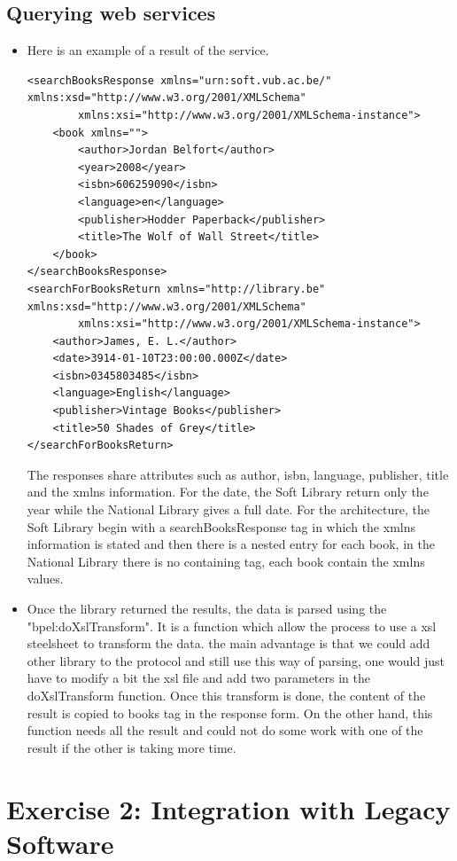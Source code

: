 \documentclass[a4paper,10pt]{article}
\begin{document}
\subsection{Querying web services}
\begin{itemize}
\item Here is an example of a result of the service.
\begin{verbatim}
<searchBooksResponse xmlns="urn:soft.vub.ac.be/" xmlns:xsd="http://www.w3.org/2001/XMLSchema"
        xmlns:xsi="http://www.w3.org/2001/XMLSchema-instance">
    <book xmlns="">
        <author>Jordan Belfort</author>
        <year>2008</year>
        <isbn>606259090</isbn>
        <language>en</language>
        <publisher>Hodder Paperback</publisher>
        <title>The Wolf of Wall Street</title>
    </book>
</searchBooksResponse>
<searchForBooksReturn xmlns="http://library.be" xmlns:xsd="http://www.w3.org/2001/XMLSchema" 
        xmlns:xsi="http://www.w3.org/2001/XMLSchema-instance">
    <author>James, E. L.</author>
    <date>3914-01-10T23:00:00.000Z</date>
    <isbn>0345803485</isbn>
    <language>English</language>
    <publisher>Vintage Books</publisher>
    <title>50 Shades of Grey</title>
</searchForBooksReturn>
\end{verbatim}
The responses share attributes such as author, isbn, language, publisher, title and the xmlns information. For the date, the Soft Library return only the year while the National Library gives a full date. For the architecture, the Soft Library begin with a searchBooksResponse tag in which the xmlns information is stated and then there is a nested entry for each book, in the National Library there is no containing tag, each book contain the xmlns values.\\

\item Once the library returned the results, the data is parsed using the "bpel:doXslTransform". It is a function which allow the process to use a xsl steelsheet to transform the data. the main advantage is that we could add other library to the protocol and still use this way of parsing, one would just have to modify a bit the xsl file and add two parameters in the doXslTransform function. Once this transform is done, the content of the result is copied to books tag in the response form. On the other hand, this function needs all the result and could not do some work with one of the result if the other is taking more time.
\end{itemize}

\section{Exercise 2: Integration with Legacy Software}
\end{document}

